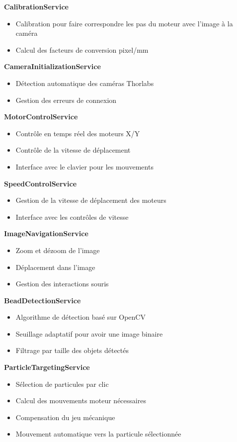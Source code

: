 \textbf{CalibrationService}
\begin{itemize}[label=\textbullet]
    \item Calibration pour faire correspondre les pas du moteur avec l'image à la caméra
    \item Calcul des facteurs de conversion pixel/mm
\end{itemize}

\textbf{CameraInitializationService}
\begin{itemize}[label=\textbullet]
    \item Détection automatique des caméras Thorlabs
    \item Gestion des erreurs de connexion
\end{itemize}

\textbf{MotorControlService}
\begin{itemize}[label=\textbullet]
    \item Contrôle en temps réel des moteurs X/Y
    \item Contrôle de la vitesse de déplacement
    \item Interface avec le clavier pour les mouvements
\end{itemize}

\textbf{SpeedControlService}
\begin{itemize}[label=\textbullet]
    \item Gestion de la vitesse de déplacement des moteurs
    \item Interface avec les contrôles de vitesse
\end{itemize}

\textbf{ImageNavigationService}
\begin{itemize}[label=\textbullet]
    \item Zoom et dézoom de l'image
    \item Déplacement dans l'image
    \item Gestion des interactions souris
\end{itemize}

\textbf{BeadDetectionService}
\begin{itemize}[label=\textbullet]
    \item Algorithme de détection basé sur OpenCV
    \item Seuillage adaptatif pour avoir une image binaire
    \item Filtrage par taille des objets détectés
\end{itemize}

\textbf{ParticleTargetingService}
\begin{itemize}[label=\textbullet]
    \item Sélection de particules par clic
    \item Calcul des mouvements moteur nécessaires
    \item Compensation du jeu mécanique
    \item Mouvement automatique vers la particule sélectionnée
\end{itemize}


